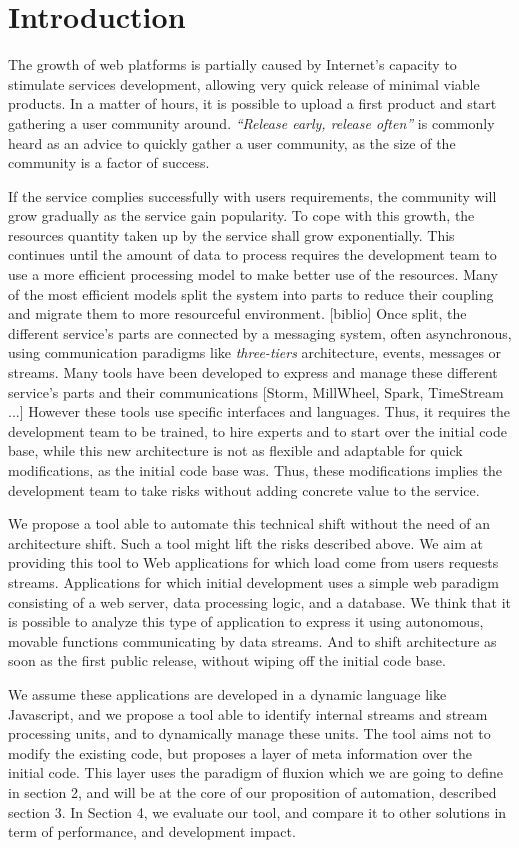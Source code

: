 \section{Introduction}


The growth of web platforms is partially caused by Internet's capacity to stimulate services development, allowing very quick release of minimal viable products.
In a matter of hours, it is possible to upload a first product and start gathering a user community around.
\textit{``Release early, release often''} is commonly heard as an advice to quickly gather a user community, as the size of the community is a factor of success.

If the service complies successfully with users requirements, the community will grow gradually as the service gain popularity.
To cope with this growth, the resources quantity taken up by the service shall grow exponentially.
This continues until the amount of data to process requires the development team to use a more efficient processing model to make better use of the resources.
Many of the most efficient models split the system into parts to reduce their coupling and migrate them to more resourceful environment. [biblio]
Once split, the different service's parts are connected by a messaging system, often asynchronous, using communication paradigms like \textit{three-tiers} architecture, events, messages or streams.
Many tools have been developed to express and manage these different service's parts and their communications [Storm, MillWheel, Spark, TimeStream ...]
However these tools use specific interfaces and languages.
Thus, it requires the development team to be trained, to hire experts and to start over the initial code base, while this new architecture is not as flexible and adaptable for quick modifications, as the initial code base was.
Thus, these modifications implies the development team to take risks without adding concrete value to the service.

We propose a tool able to automate this technical shift without the need of an architecture shift.
Such a tool might lift the risks described above.
We aim at providing this tool to Web applications for which load come from users requests streams.
Applications for which initial development uses a simple web paradigm consisting of a web server, data processing logic, and a database.
We think that it is possible to analyze this type of application to express it using autonomous, movable functions communicating by data streams.
And to shift architecture as soon as the first public release, without wiping off the initial code base.

We assume these applications are developed in a dynamic language like Javascript, and we propose a tool able to identify internal streams and stream processing units, and to dynamically manage these units.
The tool aims not to modify the existing code, but proposes a layer of meta information over the initial code.
This layer uses the paradigm of fluxion which we are going to define in section 2, and will be at the core of our proposition of automation, described section 3.
In Section 4, we evaluate our tool, and compare it to other solutions in term of performance, and development impact.